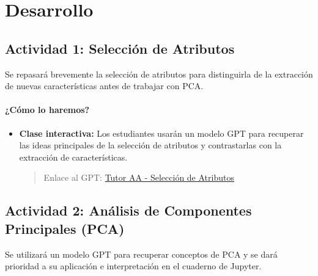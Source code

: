 \documentclass[a4,11pt]{aleph-notas}
\begin{document}
\section*{Desarrollo}

\subsection*{Actividad 1: Selección de Atributos}

Se repasará brevemente la selección de atributos para distinguirla de la extracción de nuevas características antes de trabajar con PCA.

\paragraph{¿Cómo lo haremos?}  
\begin{itemize}[leftmargin=*]
    \item \textbf{Clase interactiva:}  
    Los estudiantes usarán un modelo GPT para recuperar las ideas principales de la selección de atributos y contrastarlas con la extracción de características.
    \begin{quote}
        Enlace al GPT: \href{https://chatgpt.com/g/g-674f787b286c8191aee6a93bde4ede57-tutor-aa-seleccion-de-atributos}{Tutor AA - Selección de Atributos}
    \end{quote}
    
\end{itemize}

\subsection*{Actividad 2: Análisis de Componentes Principales (PCA)}

Se utilizará un modelo GPT para recuperar conceptos de PCA y se dará prioridad a su aplicación e interpretación en el cuaderno de Jupyter.
\end{document}
